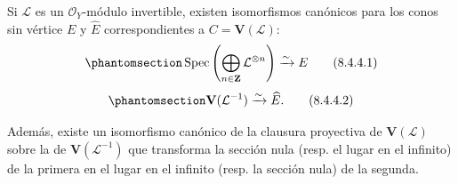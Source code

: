 \documentclass[oneside,10pt]{amsart}
\let\EGAOriginalLabel\label
\renewcommand{\label}[1]{\phantomsection\EGAOriginalLabel{#1}}
\begin{document}
\begin{proposition}[8.4.4]
\label{II.8.4.4-fr}
Si $\mathcal{L}$ es un $\mathcal{O}_Y$-módulo invertible, existen isomorfismos canónicos para los conos sin vértice $E$ y $\widehat{E}$ correspondientes a $C=\mathbf{V}(\mathcal{L})$:
\begin{equation}
\label{II.8.4.4.1-fr}
  \operatorname{Spec}\left(
    \bigoplus_{n\in\mathbf{Z}}\mathcal{L}^{\otimes n}
  \right)\xrightarrow{\sim}E
\tag{8.4.4.1}
\end{equation}
\begin{equation}
\label{II.8.4.4.2-fr}
  \mathbf{V}(\mathcal{L}^{-1})\xrightarrow{\sim}\widehat{E}.
\tag{8.4.4.2}
\end{equation}

Además, existe un isomorfismo canónico de la clausura proyectiva de $\mathbf{V}(\mathcal{L})$ sobre la de $\mathbf{V}(\mathcal{L}^{-1})$ que transforma la sección nula \textup{(resp.} el lugar en el infinito\textup{)} de la primera en el lugar en el infinito \textup{(resp.} la sección nula\textup{)} de la segunda.
\end{proposition}
\end{document}
